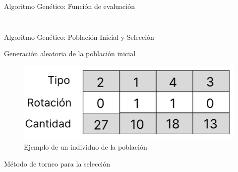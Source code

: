 \documentclass[handout]{beamer}
\begin{document}
\begin{frame}{Algoritmo Genético: Función de evaluación}
\begin{columns}
\begin{column}{0.5\textwidth}
\begin{overlayarea}{\textwidth}{\textheight}
{\begin{figure}
                    \end{figure}
                }
            \end{overlayarea}
        \end{column}
    \end{columns}
\end{frame}

\begin{frame}{Algoritmo Genético: Población Inicial y Selección}
    \begin{exampleblock}{Generación aleatoria de la población inicial}
        \vspace{1cm}
        \begin{figure}
            \centering
            \includegraphics[width=.5\textwidth]{pic/codificacion.png}
            \caption*{Ejemplo de un individuo de la población}
            \label{fig:individuo}
        \end{figure}
    \end{exampleblock}
    \begin{exampleblock}{Método de torneo para la selección}
    \end{exampleblock}
\end{frame}
\end{document}
